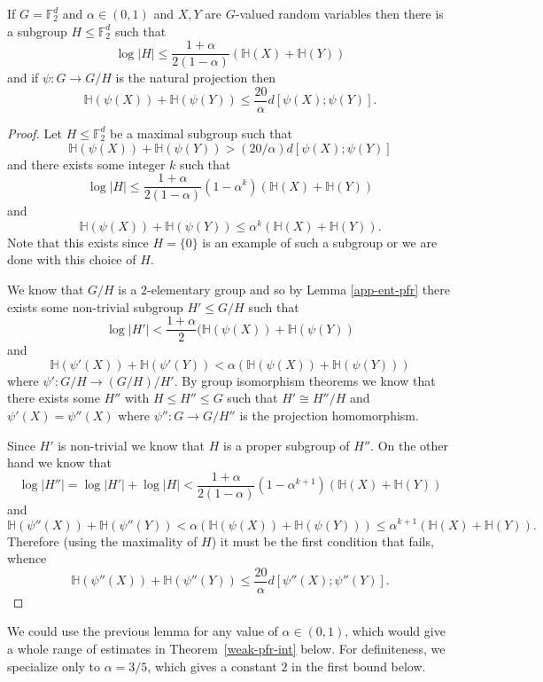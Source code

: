 \begin{lemma}\label{pfr-projection'}\leanok
If $G=\mathbb{F}_2^d$ and $\alpha\in (0,1)$ and $X,Y$ are $G$-valued random
variables then there is a subgroup $H\leq \mathbb{F}_2^d$ such that
\[\log \lvert H\rvert \leq \frac{1+\alpha}{2(1-\alpha)} (\mathbb{H}(X)+\mathbb{H}(Y))\]
and if $\psi:G \to G/H$ is the natural projection then
\[\mathbb{H}(\psi(X))+\mathbb{H}(\psi(Y))\leq \frac{20}{\alpha} d[\psi(X);\psi(Y)].\]
\end{lemma}
\begin{proof}
\leanok
Let $H\leq \mathbb{F}_2^d$ be a maximal subgroup such that
\[\mathbb{H}(\psi(X))+\mathbb{H}(\psi(Y))> (20/\alpha)d[\psi(X);\psi(Y)]\]
and there exists some integer $k$ such that
\[\log \lvert H\rvert \leq \frac{1+\alpha}{2(1-\alpha)}(1-\alpha^k)(\mathbb{H}(X)+\mathbb{H}(Y))\]
and
\[\mathbb{H}(\psi(X))+\mathbb{H}(\psi(Y))\leq \alpha^k (\mathbb{H}(X)+\mathbb{H}(Y)).\]
Note that this exists since $H=\{0\}$ is an example of such a subgroup or we are done with this choice of $H$.

We know that $G/H$ is a $2$-elementary group and so by Lemma
\ref{app-ent-pfr} there exists some non-trivial subgroup $H'\leq G/H$ such
that
\[\log \lvert H'\rvert < \frac{1+\alpha}{2}(\mathbb{H}(\psi(X))+\mathbb{H}(\psi(Y))\]
and
\[\mathbb{H}(\psi'(X))+\mathbb{H}(\psi'(Y))< \alpha(\mathbb{H}(\psi(X))+\mathbb{H}(\psi(Y)))\]
where $\psi':G/H\to (G/H)/H'$.
By group isomorphism theorems we know that there exists
some $H''$ with $H\leq H''\leq G$ such that $H'\cong H''/H$ and $\psi'(X)=\psi''(X)$ where $\psi'':G\to G/H''$ is the projection homomorphism.

Since $H'$ is non-trivial we know that $H$ is a proper subgroup of $H''$. On the other hand we know that
\[\log \lvert H''\rvert=\log \lvert H'\rvert+\log \lvert H\rvert< \frac{1+\alpha}{2(1-\alpha)}(1-\alpha^{k+1})(\mathbb{H}(X)+\mathbb{H}(Y))\]
and
\[\mathbb{H}(\psi''(X))+\mathbb{H}(\psi''(Y))< \alpha (\mathbb{H}(\psi(X))+\mathbb{H}(\psi(Y)))\leq \alpha^{k+1}(\mathbb{H}(X)+\mathbb{H}(Y)).\]
Therefore (using the maximality of $H$) it must be the first condition that fails, whence
\[\mathbb{H}(\psi''(X))+\mathbb{H}(\psi''(Y))\leq \frac{20}{\alpha}d[\psi''(X);\psi''(Y)].\]
\end{proof}

We could use the previous lemma for any value of $\alpha \in (0,1)$, which
would give a whole range of estimates in Theorem~\ref{weak-pfr-int} below.
For definiteness, we specialize only to $\alpha=3/5$, which gives a constant
$2$ in the first bound below.

